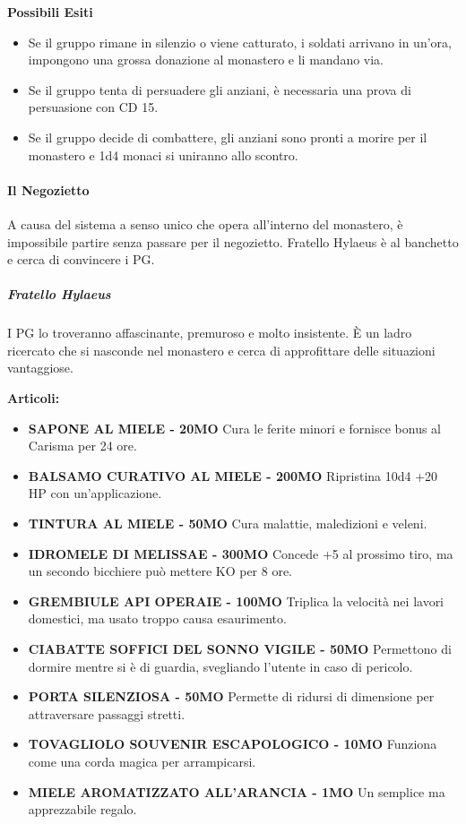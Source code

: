 \documentclass{article}
\begin{document}
\textbf{Possibili Esiti}
\begin{itemize}
    \item Se il gruppo rimane in silenzio o viene catturato, i soldati arrivano in un'ora, impongono una grossa donazione al monastero e li mandano via.
    \item Se il gruppo tenta di persuadere gli anziani, è necessaria una prova di persuasione con CD 15.
    \item Se il gruppo decide di combattere, gli anziani sono pronti a morire per il monastero e 1d4 monaci si uniranno allo scontro.
\end{itemize}


\paragraph{Il Negozietto}
A causa del sistema a senso unico che opera all'interno del monastero, è impossibile partire senza passare per il negozietto. Fratello Hylaeus è al banchetto e cerca di convincere i PG.

\subparagraph{Fratello Hylaeus} I PG lo troveranno affascinante, premuroso e molto insistente. È un ladro ricercato che si nasconde nel monastero e cerca di approfittare delle situazioni vantaggiose.

\textbf{Articoli: }
\begin{itemize}
    \item \textbf{SAPONE AL MIELE - 20MO} \newline
    Cura le ferite minori e fornisce bonus al Carisma per 24 ore.
    \item \textbf{BALSAMO CURATIVO AL MIELE - 200MO} \newline
    Ripristina 10d4 +20 HP con un'applicazione.
    \item \textbf{TINTURA AL MIELE - 50MO} \newline
    Cura malattie, maledizioni e veleni.
    \item \textbf{IDROMELE DI MELISSAE - 300MO} \newline
    Concede +5 al prossimo tiro, ma un secondo bicchiere può mettere KO per 8 ore.
    \item \textbf{GREMBIULE API OPERAIE - 100MO} \newline
    Triplica la velocità nei lavori domestici, ma usato troppo causa esaurimento.
    \item \textbf{CIABATTE SOFFICI DEL SONNO VIGILE - 50MO} \newline
    Permettono di dormire mentre si è di guardia, svegliando l'utente in caso di pericolo.
    \item \textbf{PORTA SILENZIOSA - 50MO} \newline
    Permette di ridursi di dimensione per attraversare passaggi stretti.
    \item \textbf{TOVAGLIOLO SOUVENIR ESCAPOLOGICO - 10MO} \newline
    Funziona come una corda magica per arrampicarsi.
    \item \textbf{MIELE AROMATIZZATO ALL'ARANCIA - 1MO} \newline
    Un semplice ma apprezzabile regalo.
\end{itemize}
\end{document}
